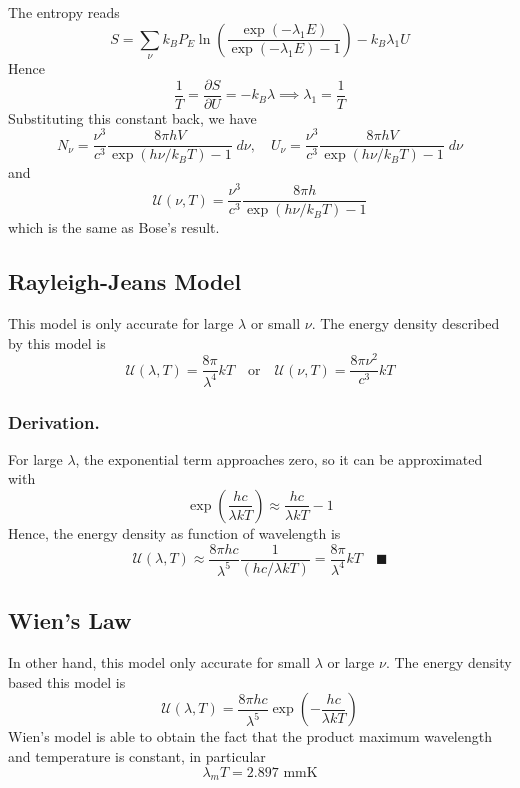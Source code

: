 \documentclass[../../../Main.tex]{subfiles}
\begin{document}
The entropy reads
\begin{equation*}
    S=\sum_\nu k_B P_E \ln\left(\frac{\exp(-\lambda_1E)}{\exp(-\lambda_1E)-1}\right)-k_B\lambda_1 U
\end{equation*}
Hence 
\begin{equation*}
    \frac{1}{T}=\frac{\partial S}{\partial U}=-k_B\lambda\implies \lambda_1=\frac{1}{T}
\end{equation*}
Substituting this constant back, we have
\begin{equation*}
    N_\nu=\frac{\nu^3}{c^3}\frac{8\pi h V}{\exp(h\nu/k_BT)-1}\;d\nu,\quad     U_\nu=\frac{\nu^3}{c^3}\frac{8\pi h V}{\exp(h\nu/k_BT)-1}\;d\nu 
\end{equation*}
and
\begin{equation*}
    \mathcal{U}(\nu,T) =\frac{\nu^3}{c^3}\frac{8\pi h}{\exp(h\nu/k_BT)-1}
\end{equation*}
which is the same as Bose's result.

\subsection*{Rayleigh-Jeans Model}
This model is only accurate for large $\lambda$ or small $\nu$. The energy density described by this model is 
\begin{equation*}
    \mathcal{U}(\lambda,T)=\frac{8\pi}{\lambda^4}kT\quad\text{or}\quad\mathcal{U}(\nu,T)=\frac{8\pi\nu^2}{c^3}kT
\end{equation*}
\subsubsection*{Derivation.} For large $\lambda$, the exponential term approaches zero, so it can be approximated with 
\begin{equation*}
    \exp\left(\frac{hc}{\lambda kT}\right)\approx\frac{hc}{\lambda kT}-1
\end{equation*}
Hence, the energy density as function of wavelength is 
\begin{equation*}
    \mathcal{U}(\lambda,T)\approx\frac{8\pi hc}{\lambda^5}\frac{1}{(hc/\lambda kT)}=\frac{8\pi}{\lambda^4}kT\quad\blacksquare
\end{equation*}

\subsection*{Wien's Law}
In other hand, this model only accurate for small $\lambda$ or large $\nu$. The energy density based this model is 
\begin{equation*}
    \mathcal{U}(\lambda,T)=\frac{8\pi hc}{\lambda^5}\exp\left(-\frac{hc}{\lambda kT}\right)
\end{equation*}
Wien's model is able to obtain the fact that the product maximum wavelength and temperature is constant, in particular
\begin{equation*}
    \lambda_m T=2.897 \text{ mmK}
\end{equation*}
\end{document}
